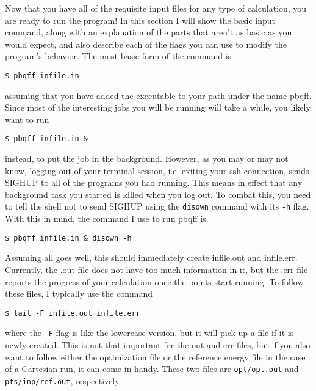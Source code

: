 \documentclass{article}
\begin{document}
Now that you have all of the requisite input files for any type of
calculation, you are ready to run the program! In this section I will
show the basic input command, along with an explanation of the parts
that aren't as basic as you would expect, and also describe each of
the flags you can use to modify the program's behavior. The most basic
form of the command is

\begin{verbatim}
$ pbqff infile.in
\end{verbatim}

\noindent
assuming that you have added the executable to your path under the
name pbqff. Since most of the interesting jobs you will be running will
take a while, you likely want to run

\begin{verbatim}
$ pbqff infile.in & 
\end{verbatim}

\noindent
instead, to put the job in the background. However, as you may or may
not know, logging out of your terminal session, i.e. exiting your ssh
connection, sends SIGHUP to all of the programs you had running. This
means in effect that any background task you started is killed when
you log out. To combat this, you need to tell the shell not to send
SIGHUP using the \verb|disown| command with its \verb|-h| flag. With
this in mind, the command I use to run pbqff is

\begin{verbatim}
$ pbqff infile.in & disown -h
\end{verbatim}

Assuming all goes well, this should immediately create infile.out and
infile.err. Currently, the .out file does not have too much
information in it, but the .err file reports the progress of your
calculation once the points start running. To follow these files, I
typically use the command

\begin{verbatim}
$ tail -F infile.out infile.err
\end{verbatim}

\noindent
where the \verb|-F| flag is like the lowercase version, but it will
pick up a file if it is newly created. This is not that important for
the out and err files, but if you also want to follow either the
optimization file or the reference energy file in the case of a
Cartesian run, it can come in handy. These two files are
\verb|opt/opt.out| and \verb|pts/inp/ref.out|, respectively.
\end{document}
